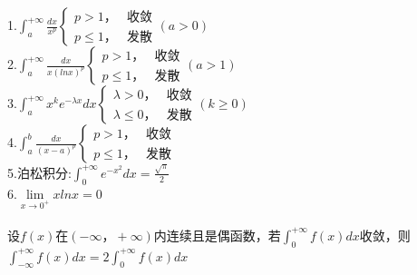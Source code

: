 \documentclass{article}
\begin{document}
\begin{flushleft}
	1.$\int_{a}^{+\infty}\frac{dx}{x^p}\left\{
	\begin{array}{lcl}
	p>1， & \mbox{收敛}\\
	p\le 1， & \mbox{发散}
	\end{array} \right.(a>0)$\\
	2.$\int_{a}^{+\infty}\frac{dx}{x(lnx)^p}\left\{
	\begin{array}{lcl}
	p>1， & \mbox{收敛}\\
	p\le 1， & \mbox{发散}
	\end{array} \right.(a>1)$\\
	3.$\int_{a}^{+\infty}x^ke^{-\lambda x}dx\left\{
	\begin{array}{lcl}
	\lambda>0， & \mbox{收敛}\\
	\lambda\le 0， & \mbox{发散}
	\end{array} \right.(k\ge 0)$\\
	4.$\int_{a}^{b}\frac{dx}{(x-a)^p}\left\{
	\begin{array}{lcl}
	p>1， & \mbox{收敛}\\
	p\le 1， & \mbox{发散}
	\end{array} \right.$\\
	5.泊松积分:$\int_{0}^{+\infty}e^{-x^2}dx=\frac{\sqrt{\pi}}{2}$\\
	6.$\lim\limits_{x\to 0^+}xlnx=0$\\
	~\\
	设$f(x)$在$(-\infty，+\infty)$内连续且是偶函数，若$\int_{0}^{+\infty}f(x)dx$收敛，则$\int_{-\infty}^{+\infty}f(x)dx=2\int_{0}^{+\infty}f(x)dx$\\
	
\end{flushleft}
\end{document}
